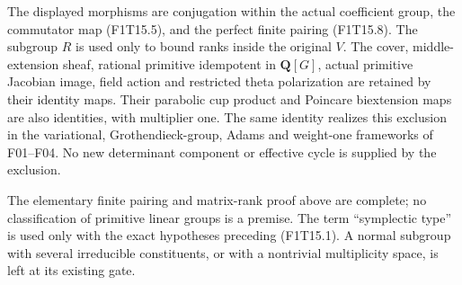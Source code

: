The displayed morphisms are conjugation within the actual coefficient
group, the commutator map (F1T15.5), and the perfect finite pairing
(F1T15.8). The subgroup $R$ is used only to bound ranks inside the
original $V$. The cover, middle-extension sheaf, rational primitive
idempotent in $\mathbf Q[G]$, actual primitive Jacobian image, field
action and restricted theta polarization are retained by their identity
maps. Their parabolic cup product and Poincare biextension maps are
also identities, with multiplier one. The same identity realizes this
exclusion in the variational, Grothendieck-group, Adams and weight-one
frameworks of F01--F04. No new determinant component or effective cycle
is supplied by the exclusion.

The elementary finite pairing and matrix-rank proof above are complete;
no classification of primitive linear groups is a premise. The term
``symplectic type'' is used only with the exact hypotheses preceding
(F1T15.1). A normal subgroup with several irreducible constituents, or
with a nontrivial multiplicity space, is left at its existing gate.
